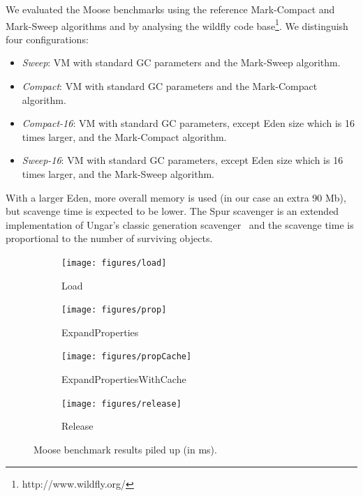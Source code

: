 \documentclass[10pt, sigplan]{acmart}
\begin{document}
We evaluated the Moose benchmarks using the reference Mark-Compact and Mark-Sweep algorithms and by analysing the wildfly code base\footnote{http://www.wildfly.org/}. We distinguish four configurations:
\begin{itemize}
\item \emph{Sweep}: VM with standard GC parameters and the Mark-Sweep algorithm.
\item \emph{Compact}: VM with standard GC parameters and the Mark-Compact algorithm.
\item \emph{Compact-16}: VM with standard GC parameters, except Eden size which is 16 times larger, and the Mark-Compact algorithm.
\item \emph{Sweep-16}: VM with standard GC parameters, except Eden size which is 16 times larger, and the Mark-Sweep algorithm.
\end{itemize}
With a larger Eden, more overall memory is used (in our case an extra 90 Mb), but scavenge time is expected to be lower. The Spur scavenger is an extended implementation of Ungar's classic generation scavenger~\cite{Scavenger} and the scavenge time is proportional to the number of surviving objects.

%
\begin{figure}[thb]
	\centering
    
    \begin{subfigure}[b]{.48\textwidth}
	\texttt{[image: figures/load]} 
	\caption{Load\vspace{0.2cm}}
   	\end{subfigure}\hspace{0.03\textwidth}%
   	\begin{subfigure}[b]{.48\textwidth}
	\texttt{[image: figures/prop]} 
	\caption{ExpandProperties\vspace{0.2cm}}
   	\end{subfigure}	
	\begin{subfigure}[b]{.48\textwidth}
	\texttt{[image: figures/propCache]} 
	\caption{ExpandPropertiesWithCache}
	\end{subfigure}\hspace{0.03\textwidth}%
	   	\begin{subfigure}[b]{.48\textwidth}
	\texttt{[image: figures/release]} 
	\caption{Release}
   	\end{subfigure}

   	   	    	
\caption{Moose benchmark results piled up (in ms).} \label{MooseRes1}
\end{figure}
\end{document}
